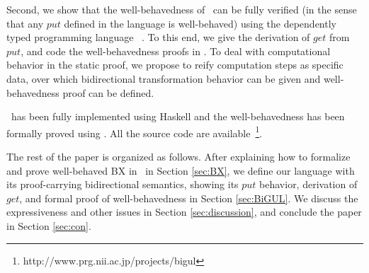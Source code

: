 Second, we show that the well-behavedness of \BiGUL\ can be fully verified (in the sense that any $put$ defined in the language is well-behaved) using the dependently typed programming language \Agda~\cite{Nore08}. To this end, we give the derivation of $get$ from $put$, and code the well-behavedness proofs in \Agda.
To deal with computational behavior in the static proof, we propose to reify computation steps as specific data, over which bidirectional transformation behavior can be given and well-behavedness proof can be defined.
%


\BiGUL\ has been fully implemented using Haskell and the well-behavedness has been formally proved using \Agda. All the source code are available~\footnote{http://www.prg.nii.ac.jp/projects/bigul}.

The rest of the paper is organized as follows. After explaining how to formalize and prove well-behaved BX in \Agda\ in Section \ref{sec:BX}, we define our language \BiGUL with its proof-carrying bidirectional semantics, showing its $put$ behavior, derivation of $get$, and formal proof of well-behavedness in Section \ref{sec:BiGUL}. We discuss the expressiveness and other issues in Section \ref{sec:discussion}, and conclude the paper in Section \ref{sec:con}.

